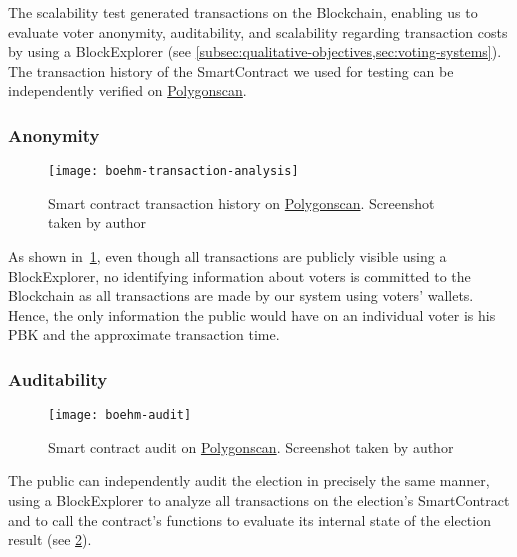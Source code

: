 The scalability test generated transactions on the \gls{Blockchain}, enabling us to evaluate voter anonymity, auditability, and scalability regarding transaction costs by using a \gls{BlockExplorer} (see \cref{subsec:qualitative-objectives,sec:voting-systems}).
The transaction history of the \gls{SmartContract} we used for testing can be independently verified on \href{https://mumbai.polygonscan.com/address/0x626aec8b9220bee641bc4098fa73f8cc55e50a8f}{Polygonscan}.

\subsubsection{Anonymity}

\begin{figure}[h]
    \centering
    \texttt{[image: boehm-transaction-analysis]}
    \caption[Smart contract transaction history]{Smart contract transaction history on \href{https://mumbai.polygonscan.com/address/0x626aec8b9220bee641bc4098fa73f8cc55e50a8f}{Polygonscan}. Screenshot taken by author}
    \label{fig:transaction-analysis}
\end{figure}

As shown in~\cref{fig:transaction-analysis}, even though all transactions are publicly visible using a \gls{BlockExplorer}, no identifying information about voters is committed to the \gls{Blockchain} as all transactions are made by our system using voters' wallets.
Hence, the only information the public would have on an individual voter is his \gls{PBK} and the approximate transaction time.

\subsubsection{Auditability}

\begin{figure}[h]
    \centering
    \texttt{[image: boehm-audit]}
    \caption[Smart contract audit]{Smart contract audit on \href{https://mumbai.polygonscan.com/address/0x626aec8b9220bee641bc4098fa73f8cc55e50a8f}{Polygonscan}. Screenshot taken by author}
    \label{fig:audit}
\end{figure}

The public can independently audit the election in precisely the same manner, using a \gls{BlockExplorer} to analyze all transactions on the election’s \gls{SmartContract} and to call the contract’s functions to evaluate its internal state of the election result (see \cref{fig:audit}).


